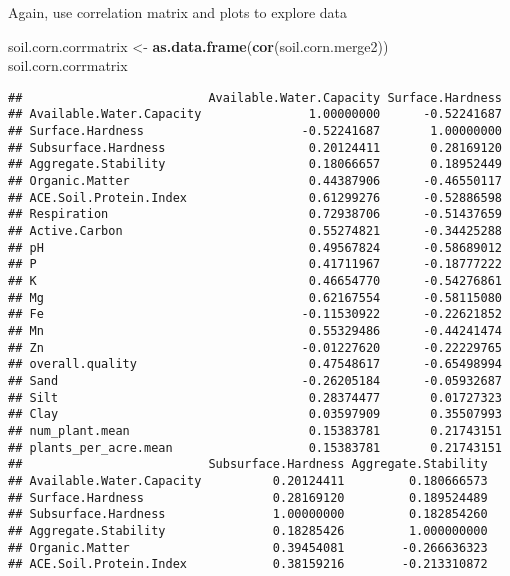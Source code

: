\documentclass[]{article}
\newenvironment{Shaded}{\begin{snugshade}}{\end{snugshade}}
\newcommand{\KeywordTok}[1]{\textcolor[rgb]{0.13,0.29,0.53}{\textbf{#1}}}
\newcommand{\StringTok}[1]{\textcolor[rgb]{0.31,0.60,0.02}{#1}}
\newcommand{\NormalTok}[1]{#1}
\begin{document}
Again, use correlation matrix and plots to explore data

\begin{Shaded}
\begin{Highlighting}[]
\NormalTok{soil.corn.corrmatrix <-}\StringTok{ }\KeywordTok{as.data.frame}\NormalTok{(}\KeywordTok{cor}\NormalTok{(soil.corn.merge2))}
\NormalTok{soil.corn.corrmatrix}
\end{Highlighting}
\end{Shaded}

\begin{verbatim}
##                          Available.Water.Capacity Surface.Hardness
## Available.Water.Capacity               1.00000000      -0.52241687
## Surface.Hardness                      -0.52241687       1.00000000
## Subsurface.Hardness                    0.20124411       0.28169120
## Aggregate.Stability                    0.18066657       0.18952449
## Organic.Matter                         0.44387906      -0.46550117
## ACE.Soil.Protein.Index                 0.61299276      -0.52886598
## Respiration                            0.72938706      -0.51437659
## Active.Carbon                          0.55274821      -0.34425288
## pH                                     0.49567824      -0.58689012
## P                                      0.41711967      -0.18777222
## K                                      0.46654770      -0.54276861
## Mg                                     0.62167554      -0.58115080
## Fe                                    -0.11530922      -0.22621852
## Mn                                     0.55329486      -0.44241474
## Zn                                    -0.01227620      -0.22229765
## overall.quality                        0.47548617      -0.65498994
## Sand                                  -0.26205184      -0.05932687
## Silt                                   0.28374477       0.01727323
## Clay                                   0.03597909       0.35507993
## num_plant.mean                         0.15383781       0.21743151
## plants_per_acre.mean                   0.15383781       0.21743151
##                          Subsurface.Hardness Aggregate.Stability
## Available.Water.Capacity          0.20124411         0.180666573
## Surface.Hardness                  0.28169120         0.189524489
## Subsurface.Hardness               1.00000000         0.182854260
## Aggregate.Stability               0.18285426         1.000000000
## Organic.Matter                    0.39454081        -0.266636323
## ACE.Soil.Protein.Index            0.38159216        -0.213310872

\end{verbatim}
\end{document}
